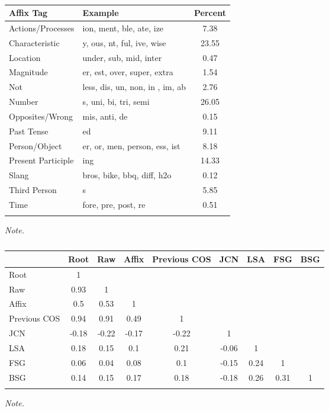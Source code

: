 \documentclass[english,man]{apa6}
\theoremstyle{definition}
\theoremstyle{definition}
\theoremstyle{definition}
\theoremstyle{remark}
\begin{document}
\begin{table}[tbp]
\begin{center}
\begin{threeparttable}
\caption{\label{tab:unnamed-chunk-7}}
\begin{tabular}{llc}
\toprule
Affix Tag & Example & Percent\\
\midrule
Actions/Processes & ion, ment, ble, ate, ize & 7.38\\
Characteristic & y, ous, nt, ful, ive, wise & 23.55\\
Location & under, sub, mid, inter & 0.47\\
Magnitude & er, est, over, super, extra & 1.54\\
Not & less, dis, un, non, in , im, ab & 2.76\\
Number & s, uni, bi, tri, semi & 26.05\\
Opposites/Wrong & mis, anti, de & 0.15\\
Past Tense & ed & 9.11\\
Person/Object & er, or, men, person, ess, ist & 8.18\\
Present Participle & ing & 14.33\\
Slang & bros, bike, bbq, diff, h2o & 0.12\\
Third Person & s & 5.85\\
Time & fore, pre, post, re & 0.51\\
\bottomrule
\addlinespace
\end{tabular}
\begin{tablenotes}[para]
\textit{Note.} 
\end{tablenotes}
\end{threeparttable}
\end{center}
\end{table}

\begin{table}[tbp]
\begin{center}
\begin{threeparttable}
\caption{\label{tab:unnamed-chunk-11}}
\begin{tabular}{lcccccccc}
\toprule
  & Root & Raw & Affix & Previous COS & JCN & LSA & FSG & BSG\\
\midrule
Root & 1 &  &  &  &  &  &  & \\
Raw & 0.93 & 1 &  &  &  &  &  & \\
Affix & 0.5 & 0.53 & 1 &  &  &  &  & \\
Previous COS & 0.94 & 0.91 & 0.49 & 1 &  &  &  & \\
JCN & -0.18 & -0.22 & -0.17 & -0.22 & 1 &  &  & \\
LSA & 0.18 & 0.15 & 0.1 & 0.21 & -0.06 & 1 &  & \\
FSG & 0.06 & 0.04 & 0.08 & 0.1 & -0.15 & 0.24 & 1 & \\
BSG & 0.14 & 0.15 & 0.17 & 0.18 & -0.18 & 0.26 & 0.31 & 1\\
\bottomrule
\addlinespace
\end{tabular}
\begin{tablenotes}[para]
\textit{Note.} 
\end{tablenotes}
\end{threeparttable}
\end{center}
\end{table}
\end{document}
